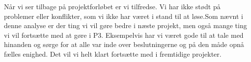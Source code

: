 Når vi ser tilbage på projektforløbet er vi tilfredse. Vi har ikke stødt på problemer eller konflikter, som vi ikke har været i stand til at løse.Som nævnt i denne analyse er der ting vi vil gøre bedre i næste projekt, men også mange ting vi vil fortsætte med at gøre i P3. Eksempelvis har vi været gode til at tale med hinanden og sørge for at alle var inde over beslutningerne og på den måde opnå fælles enighed. Det vil vi helt klart fortsætte med i fremtidige projekter. 